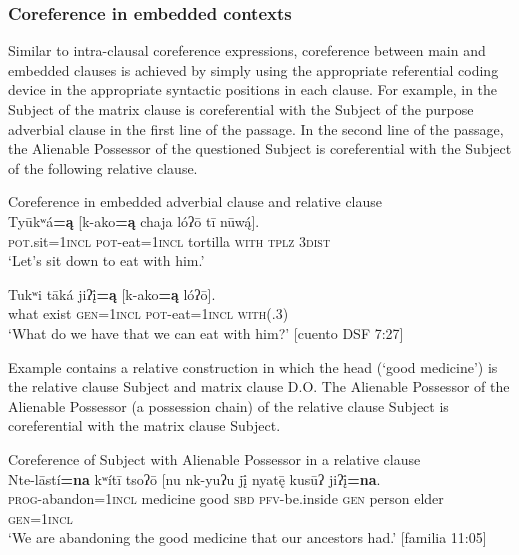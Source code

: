 \documentclass[output=paper]{../langscibook}
\begin{document}
\subsubsection{Coreference in embedded contexts}
\label{sec:campbell:4.2.2}

Similar to intra-clausal coreference expressions, coreference between main and embedded clauses is achieved by simply using the appropriate referential coding device in the appropriate syntactic positions in each clause. For example, in  the Subject of the matrix clause is coreferential with the Subject of the purpose adverbial clause in the first line of the passage. In the second line of the passage, the Alienable Possessor of the questioned Subject is coreferential with the Subject of the following relative clause.


\ea\label{ex:campbell:36}
\ea
{Coreference in embedded adverbial clause and relative clause}\\
\gll Tyūkʷá\textbf{=ą}  [k-ako\textbf{=ą}  chaja  lóʔō  tī  nūw\'{ą}].\\
     \textsc{pot.}sit=1\textsc{incl}  \textsc{pot}{}-eat=\textsc{1incl}  tortilla  \textsc{with}  \textsc{tplz}  \textsc{3dist}\\
\glt ‘Let’s sit down to eat with him.’

\ex
\gll Tukʷi  tāká  jiʔį̄\textbf{=ą}  [k-ako\textbf{=ą}  lóʔō].\\
     what  exist  \textsc{gen=1incl}  \textsc{pot}{}-eat=\textsc{1incl}  \textsc{with(.3)}\\
\glt ‘What do we have that we can eat with him?’ [cuento DSF 7:27]
\z
\z


Example  contains a relative construction in which the head (‘good medicine’) is the relative clause Subject and matrix clause D.O. The Alienable Possessor of the Alienable Possessor (a possession chain) of the relative clause Subject is coreferential with the matrix clause Subject.


\ea\label{ex:campbell:37}
{Coreference of Subject with Alienable Possessor in a relative clause}\\
\gll Nte-lāstí\textbf{=na}  kʷítī  tsoʔō  [nu  nk-yuʔu   jį̄  nyat\={ę}  kusūʔ  jiʔį̄\textbf{=na}.\\
     \textsc{prog}{}-abandon=1\textsc{incl}  medicine  good  \textsc{sbd}  \textsc{pfv}{}-be.inside  \textsc{gen}  person  elder  \textsc{gen=}1\textsc{incl}\\
\glt ‘We are abandoning the good medicine that our ancestors had.’ [familia 11:05]
\z
\end{document}
